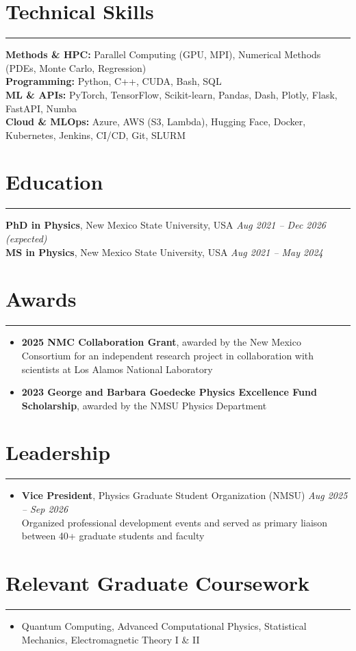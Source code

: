 \documentclass[11pt]{article}
\begin{document}
\vspace{0.3em}
\section*{Technical Skills}
\hrule
\vspace{0.3em}
\textbf{Methods \& HPC:} Parallel Computing (GPU, MPI), Numerical Methods (PDEs, Monte Carlo, Regression) \\
\textbf{Programming:} Python, C++, CUDA, Bash, SQL \\
\textbf{ML \& APIs:} PyTorch, TensorFlow, Scikit-learn, Pandas, Dash, Plotly, Flask, FastAPI, Numba \\
\textbf{Cloud \& MLOps:} Azure, AWS (S3, Lambda), Hugging Face, Docker, Kubernetes, Jenkins, CI/CD, Git, SLURM

\vspace{0.3em}
\section*{Education}
\hrule
\vspace{0.3em}
\textbf{PhD in Physics}, New Mexico State University, USA \hfill \textit{Aug 2021 -- Dec 2026 (expected)} \\
\textbf{MS in Physics}, New Mexico State University, USA \hfill \textit{Aug 2021 -- May 2024}

\vspace{0.3em}
\section*{Awards}
\hrule
\vspace{-0.3em}
\begin{itemize}
    \item \textbf{2025 NMC Collaboration Grant}, awarded by the New Mexico Consortium for an independent research project in collaboration with scientists at Los Alamos National Laboratory
    \vspace{-0.5em}
    \item \textbf{2023 George and Barbara Goedecke Physics Excellence Fund Scholarship}, awarded by the NMSU Physics Department
\end{itemize}

\vspace{0.3em}
\section*{Leadership}
\hrule
\vspace{-0.3em}
\begin{itemize}
    \item \textbf{Vice President}, Physics Graduate Student Organization (NMSU) \hfill \textit{Aug 2025 -- Sep 2026} \\ Organized professional development events and served as primary liaison between 40+ graduate students and faculty
\end{itemize}

\section*{Relevant Graduate Coursework}
\hrule
\vspace{-0.3em}
\begin{itemize}
    \item Quantum Computing, Advanced Computational Physics, Statistical Mechanics, Electromagnetic Theory I \& II
\end{itemize}
\end{document}
